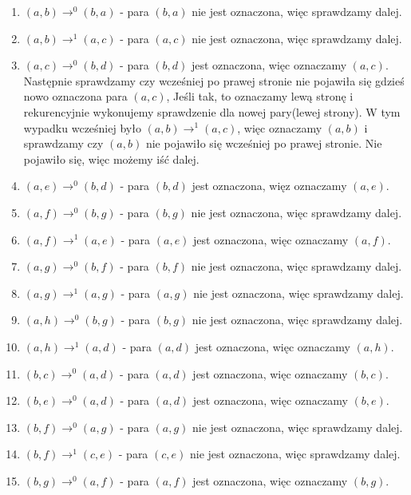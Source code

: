 \documentclass{article}
\begin{document}
    \begin{enumerate}
        \item $(a,b) \rightarrow^0 (b, a)$ - para $(b, a)$ nie jest oznaczona, więc sprawdzamy dalej.
        \item $(a,b) \rightarrow^1 (a, c)$ - para $(a, c)$ nie jest oznaczona, więc sprawdzamy dalej.
        \item $(a,c) \rightarrow^0 (b, d)$ - para $(b, d)$ jest oznaczona, więc oznaczamy $(a, c)$. Następnie sprawdzamy czy wcześniej 
            po prawej stronie nie pojawiła się gdzieś nowo oznaczona para $(a, c)$, Jeśli tak, to oznaczamy lewą stronę i rekurencyjnie 
            wykonujemy sprawdzenie dla nowej pary(lewej strony). W tym wypadku wcześniej było $(a,b) \rightarrow^1 (a, c)$, więc 
            oznaczamy $(a, b)$ i sprawdzamy czy $(a, b)$ nie pojawiło się wcześniej po prawej stronie. Nie pojawiło się, więc możemy iść dalej.
        \item $(a,e) \rightarrow^0 (b, d)$ - para $(b, d)$ jest oznaczona, więz oznaczamy $(a, e)$.
        \item $(a,f) \rightarrow^0 (b, g)$ - para $(b, g)$ nie jest oznaczona, więc sprawdzamy dalej.
        \item $(a,f) \rightarrow^1 (a, e)$ - para $(a, e)$ jest oznaczona, więc oznaczamy $(a, f)$.
        \item $(a,g) \rightarrow^0 (b, f)$ - para $(b, f)$ nie jest oznaczona, więc sprawdzamy dalej.
        \item $(a,g) \rightarrow^1 (a, g)$ - para $(a, g)$ nie jest oznaczona, więc sprawdzamy dalej.
        \item $(a,h) \rightarrow^0 (b, g)$ - para $(b, g)$ nie jest oznaczona, więc sprawdzamy dalej.
        \item $(a,h) \rightarrow^1 (a, d)$ - para $(a, d)$ jest oznaczona, więc oznaczamy $(a, h)$.
        \item $(b,c) \rightarrow^0 (a, d)$ - para $(a, d)$ jest oznaczona, więc oznaczamy $(b, c)$.
        \item $(b,e) \rightarrow^0 (a, d)$ - para $(a, d)$ jest oznaczona, więc oznaczamy $(b, e)$.
        \item $(b,f) \rightarrow^0 (a, g)$ - para $(a, g)$ nie jest oznaczona, więc sprawdzamy dalej.
        \item $(b,f) \rightarrow^1 (c, e)$ - para $(c, e)$ nie jest oznaczona, więc sprawdzamy dalej.
        \item $(b,g) \rightarrow^0 (a, f)$ - para $(a, f)$ jest oznaczona, więc oznaczamy $(b, g)$.

\end{enumerate}
\end{document}
